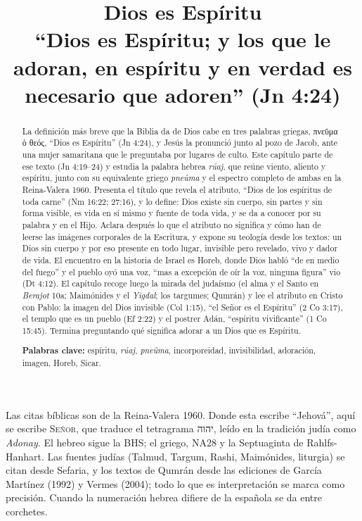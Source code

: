 \documentclass[11pt,letterpaper]{article}
\title{\color{azul}\bfseries Dios es Espíritu\\[4pt]\large\color{gris}\mdseries ``Dios es Espíritu; y los que le adoran, en espíritu y en verdad es necesario que adoren'' (Jn 4:24)}
\author{}\date{}
\newcommand{\heb}[1]{\mbox{\foreignlanguage{hebrew}{#1}}}
\newcommand{\grc}[1]{\foreignlanguage{ancientgreek}{#1}}
\newcommand{\SENOR}{\textsc{Señor}}
\begin{document}
\maketitle\thispagestyle{empty}

\begin{abstract}\noindent
La definición más breve que la Biblia da de Dios cabe en tres palabras griegas, \grc{πνεῦμα ὁ θεός}, ``Dios es Espíritu'' (Jn 4:24), y Jesús la pronunció junto al pozo de Jacob, ante una mujer samaritana que le preguntaba por lugares de culto. Este capítulo parte de ese texto (Jn 4:19--24) y estudia la palabra hebrea \emph{rúaj}, que reúne viento, aliento y espíritu, junto con su equivalente griego \emph{pneûma} y el espectro completo de ambas en la Reina-Valera 1960. Presenta el título que revela el atributo, ``Dios de los espíritus de toda carne'' (Nm 16:22; 27:16), y lo define: Dios existe sin cuerpo, sin partes y sin forma visible, es vida en sí mismo y fuente de toda vida, y se da a conocer por su palabra y en el Hijo. Aclara después lo que el atributo no significa y cómo han de leerse las imágenes corporales de la Escritura, y expone su teología desde los textos: un Dios sin cuerpo y por eso presente en todo lugar, invisible pero revelado, vivo y dador de vida. El encuentro en la historia de Israel es Horeb, donde Dios habló ``de en medio del fuego'' y el pueblo oyó una voz, ``mas a excepción de oír la voz, ninguna figura'' vio (Dt 4:12). El capítulo recoge luego la mirada del judaísmo (el alma y el Santo en \emph{Berajot} 10a; Maimónides y el \emph{Yigdal}; los targumes; Qumrán) y lee el atributo en Cristo con Pablo: la imagen del Dios invisible (Col 1:15), ``el Señor es el Espíritu'' (2 Co 3:17), el templo que es un pueblo (Ef 2:22) y el postrer Adán, ``espíritu vivificante'' (1 Co 15:45). Termina preguntando qué significa adorar a un Dios que es Espíritu.
\par\smallskip\noindent\textbf{Palabras clave:} espíritu, \emph{rúaj}, \emph{pneûma}, incorporeidad, invisibilidad, adoración, imagen, Horeb, Sicar.\end{abstract}

\begin{nota}
Las citas bíblicas son de la Reina-Valera 1960. Donde esta escribe ``Jehová'', aquí se escribe \SENOR, que traduce el tetragrama \heb{יהוה}, leído en la tradición judía como \emph{Adonay}. El hebreo sigue la BHS; el griego, NA28 y la Septuaginta de Rahlfs-Hanhart. Las fuentes judías (Talmud, Targum, Rashi, Maimónides, liturgia) se citan desde Sefaria, y los textos de Qumrán desde las ediciones de García Martínez (1992) y Vermes (2004); todo lo que es interpretación se marca como precisión. Cuando la numeración hebrea difiere de la española se da entre corchetes.
\end{nota}
\end{document}
